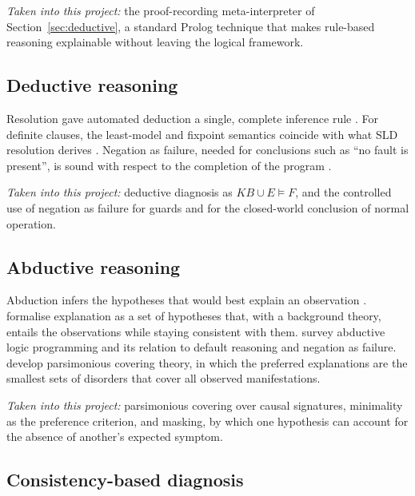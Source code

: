 \emph{Taken into this project:} the proof-recording meta-interpreter of Section~\ref{sec:deductive}, a standard Prolog technique that makes rule-based reasoning explainable without leaving the logical framework.

\subsection{Deductive reasoning}

Resolution gave automated deduction a single, complete inference rule \parencite{robinson1965}. For definite clauses, the least-model and fixpoint semantics coincide with what SLD resolution derives \parencite{apt1982,lloyd1987}. Negation as failure, needed for conclusions such as ``no fault is present'', is sound with respect to the completion of the program \parencite{clark1978}.

\emph{Taken into this project:} deductive diagnosis as $\mathit{KB} \cup E \models F$, and the controlled use of negation as failure for guards and for the closed-world conclusion of normal operation.

\subsection{Abductive reasoning}

Abduction infers the hypotheses that would best explain an observation \parencite{josephson1994}. \textcite{poole1989} formalise explanation as a set of hypotheses that, with a background theory, entails the observations while staying consistent with them. \textcite{kakas1992} survey abductive logic programming and its relation to default reasoning and negation as failure. \textcite{peng1990} develop parsimonious covering theory, in which the preferred explanations are the smallest sets of disorders that cover all observed manifestations.

\emph{Taken into this project:} parsimonious covering over causal signatures, minimality as the preference criterion, and masking, by which one hypothesis can account for the absence of another's expected symptom.

\subsection{Consistency-based diagnosis}

